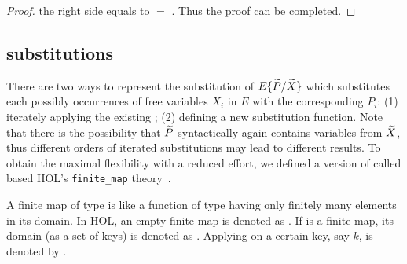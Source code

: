 \begin{proof}
    the right side equals to  $=$
    . Thus
the    proof can 
 be completed.
\end{proof}

\subsection{\Multivariate substitutions}

There are two ways to represent  the \multivariate
substitution of $E\{\widetilde P/\widetilde X\}$ which substitutes each possibly
occurrences of free variables $X_i$ in $E$ with the corresponding
$P_i$: (1) iterately applying the existing \univariate
{}; (2) defining a new \multivariate substitution
function.
Note that  there is the
possibility that $\widetilde P$   syntactically  again contains variables from $\widetilde X$, thus
different orders of iterated substitutions may lead to different results.
To obtain the
maximal flexibility with a reduced effort, we defined
a \multivariate version of 
called  based HOL's \texttt{finite\_map} theory~\cite{holdesc}.

A finite map of type \HOLinline{\ensuremath{\alpha} \HOLTokenMapto{} \ensuremath{\beta}} is like a function of type
\HOLinline{\ensuremath{\alpha} \HOLTokenTransEnd \ensuremath{\beta}} having only finitely many elements in its
domain. In HOL, an empty finite map is denoted as .
If  is a finite map, its domain (as a set of keys) is denoted as
. Applying  on a certain key, say $k$, is denoted
by .

